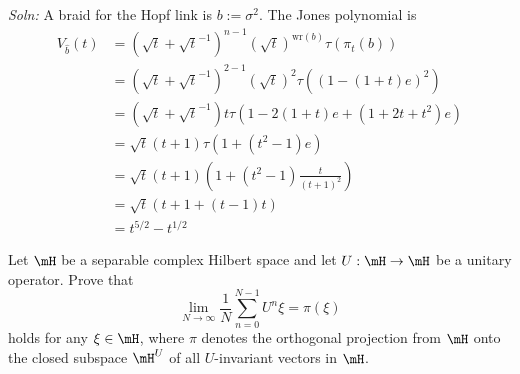 \documentclass{article}
\begin{document}
\emph{Soln:} A braid for the Hopf link is $b := \sigma^2$.  The Jones polynomial is
\begin{align*}
  V_{\hat{b}}(t) & = (\sqrt{t} + \sqrt{t}^{-1})^{n-1} (\sqrt{t})^{\text{wr}(b)} \tau(\pi_t(b)) \\
    & = (\sqrt{t} + \sqrt{t}^{-1})^{2-1} (\sqrt{t})^2 \tau((1 - (1+t)e)^2) \\
    & = (\sqrt{t} + \sqrt{t}^{-1}) t \tau(1- 2(1+t)e + (1 + 2t + t^2) e ) \\
    & = \sqrt{t} (t + 1) \tau(1 + (t^2 -1) e ) \\
    & = \sqrt{t} (t + 1) (1 + (t^2 -1) \frac{t}{(t+1)^2})  \\
    & = \sqrt{t} (t+1 + (t -1) t)  \\
    & = t^{5/2}  - t^{1/2}
\end{align*}
    

 Let $\mH$ be a separable complex Hilbert space and let $U: \mH \to \mH$ be a unitary operator.  Prove that
$$ \lim_{N \to \infty} \frac{1}{N} \sum_{n = 0}^{N -1} U^n \xi = \pi(\xi)$$
holds for any $\xi \in \mH$, where $\pi$ denotes the orthogonal projection from $\mH$ onto the closed subspace $\mH^U$ of all $U$-invariant vectors in $\mH$.
\end{document}
